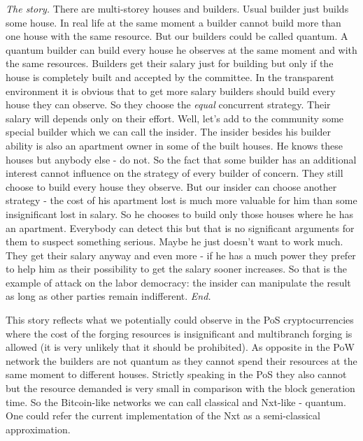 \documentclass[12pt]{article}
\begin{document}
{\it The story.} There are multi-storey houses and builders. Usual builder just builds some house. In real life at the same moment a builder cannot build more than 
one house with the same resource. But our builders could be called quantum. A quantum builder can build every house he observes at the same moment and with the
same resources. Builders get their salary just for building but only if the house is completely built and accepted by the committee. In the transparent environment
it is obvious that to get more salary builders should build every house they can observe. So they choose the {\it equal} concurrent strategy. Their salary will
depends only on their effort. Well, let's add to the community some special builder which we can call the insider. The insider besides his builder ability
is also an apartment owner in some of the built houses. He knows these houses but anybody else \-- do not. So the fact that some builder has an additional 
interest cannot influence on the strategy
of every builder of concern. They still choose to build every house they observe. But our insider can choose another strategy \-- the cost of his apartment lost
is much more valuable for him than some insignificant lost in salary. So he chooses to build only those houses where he has an apartment. Everybody can detect this
but that is no significant arguments for them to suspect something serious. Maybe he just doesn't want to work much. They get their salary anyway and even more \--
if he has a much power they prefer to help him as their possibility to get the salary sooner increases. So that is the example of attack on the labor 
democracy: the insider can manipulate the result as long as other parties remain indifferent. {\it End.}  

This story reflects what we potentially could observe in the PoS cryptocurrencies where the cost of the forging resources is insignificant and multibranch forging
is allowed (it is very unlikely that it should be prohibited). As opposite in the PoW network the builders are not quantum as 
they cannot spend their resources at the same moment to different houses. Strictly speaking in the PoS they also cannot but the resource 
demanded is very small in comparison with the block generation time. So the Bitcoin-like networks we can call classical and Nxt-like \-- quantum. 
One could refer the current implementation of the Nxt as a semi-classical approximation. 
\end{document}
